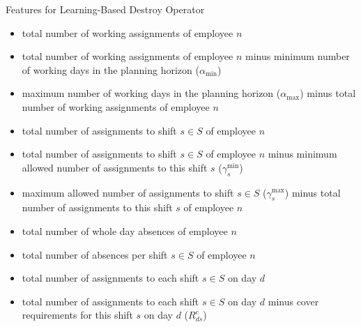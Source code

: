 \documentclass[aspectratio=1610]{beamer}
\renewcommand{\footnotesize}{\scriptsize}
\begin{document}
\begin{frame}{Features for Learning-Based Destroy Operator}
	\footnotesize
	\begin{itemize}
		\item total number of working assignments of employee $n$  
		\item total number of working assignments of employee $n$ minus minimum number of working days in the planning horizon ($\alpha_{\min}$) 
		\item maximum number of working days in the planning horizon ($\alpha_{\max}$) minus total number of working assignments of employee $n$ 
		\item total number of assignments to shift $s \in S$ of employee $n$ 
		\item total number of assignments to shift $s \in S$ of employee $n$ minus minimum allowed number of assignments to this shift $s$ ($\gamma^{\min}_s$)  
		\item maximum allowed number of assignments to shift $s \in S$ ($\gamma^{\max}_s$) minus total number of assignments to this shift $s$ of employee $n$  
		\item total number of whole day absences of employee $n$
		\item total number of absences per shift $s \in S$ of employee $n$  
	\end{itemize}

	\medskip
	\footnotesize
	\begin{itemize}
		\item total number of assignments to each shift $s \in S$ on day $d$  
		\item total number of assignments to each shift $s \in S$ on day $d$ minus cover requirements for this shift $s$ on day $d$ ($R^\text{c}_{ds}$)  
	\end{itemize}
\end{frame}
\end{document}

